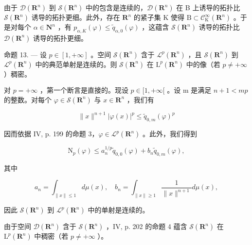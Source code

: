 由于 \(\mathcal{D}(\mathbf{R}^{n})\) 到 \(\mathcal{S}(\mathbf{R}^{n})\) 中的包含是连续的，\(\mathcal{D}(\mathbf{R}^{n})\) 在 B 上诱导的拓扑比 \(\mathcal{S}(\mathbf{R}^{n})\) 诱导的拓扑更细。此外，存在 \(\mathbf{R}^{n}\) 的紧子集 K 使得 \(\mathrm{B} \subset \mathcal{C}_{\mathrm{K}}^{\infty}(\mathbf{R}^{n})\) 。于是对每个 \(\alpha \in \mathbf{N}^{n}\) ，有 \(p_{\alpha,K}(\varphi) \leqslant \widetilde{q}_{\alpha,0}(\varphi)\) ，这蕴含 \(\mathcal{S}(\mathbf{R}^{n})\) 诱导的拓扑比 \(\mathcal{D}(\mathbf{R}^{n})\) 诱导的拓扑更细。

命题 13. --- 设 \(p \in [1, +\infty]\) 。空间 \(\mathcal{S}(\mathbf{R}^{n})\) 含于 \(\mathcal{L}^{p}(\mathbf{R}^{n})\) ，且 \(\mathcal{S}(\mathbf{R}^{n})\) 到 \(\mathcal{L}^{p}(\mathbf{R}^{n})\) 中的典范单射是连续的。则 \(\mathcal{S}(\mathbf{R}^{n})\) 在 \(\mathrm{L}^{p}(\mathbf{R}^{n})\) 中的像（若 \(p \neq +\infty\) ）稠密。

对 \(p = +\infty\) ，第一个断言是直接的。现设 \(p \in [1, +\infty[\) 。设 m 是满足 \(n + 1 < mp\) 的整数。对每个 \(\varphi \in \mathcal{S}(\mathbf{R}^{n})\) 与 \(x \in \mathbf{R}^{n}\) ，我们有

\[
\| x \| ^ {n + 1} | \varphi (x) | ^ {p} \leqslant \widetilde {q} _ {0, m} (\varphi) ^ {p}
\]

因而依据 IV, p. 199 的命题 3，\(\varphi \in \mathcal{L}^p (\mathbf{R}^n)\) 。此外，我们得到

\[
\mathrm{N} _ {p} (\varphi) \leqslant a _ {n} ^ {1 / p} \widetilde {q} _ {0, 0} (\varphi) + b _ {n} \widetilde {q} _ {0, m} (\varphi),
\]

其中

\[
a _ {n} = \int_ {\| x \| \leqslant 1} d \mu (x), \quad b _ {n} = \int_ {\| x \| \geqslant 1} \frac {1}{\| x \| ^ {n + 1}} d \mu (x),
\]

因此 \(\mathcal{S}(\mathbf{R}^n)\) 到 \(\mathcal{L}^p (\mathbf{R}^n)\) 中的单射是连续的。

由于空间 \(\mathcal{D}(\mathbf{R}^n)\) 含于 \(\mathcal{S}(\mathbf{R}^n)\) ，IV, p. 202 的命题 4 蕴含 \(\mathcal{S}(\mathbf{R}^n)\) 在 \(\mathrm{L}^p (\mathbf{R}^n)\) 中稠密（若 \(p\neq +\infty\) ）。

